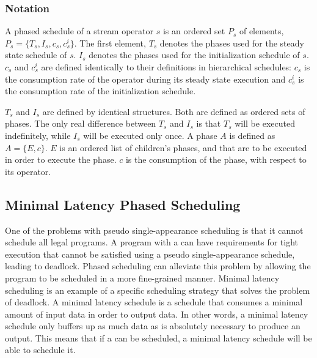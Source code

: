 \subsubsection{Notation}

A phased schedule of a stream operator $s$ is an ordered set
$P_s$ of elements, $P_s = \{T_s, I_s, c_s, c^i_s\}$.  The first
element, $T_s$ denotes the phases used for the steady state
schedule of $s$. $I_s$ denotes the phases used for the
initialization schedule of $s$. $c_s$ and $c^i_s$ are defined
identically to their definitions in hierarchical schedules: $c_s$
is the consumption rate of the operator during its steady state
execution and $c^i_s$ is the consumption rate of the
initialization schedule.

$T_s$ and $I_s$ are defined by identical structures.  Both are
defined as ordered sets of phases. The only real difference
between $T_s$ and $I_s$ is that $T_s$ will be executed
indefinitely, while $I_s$ will be executed only once. A phase $A$
is defined as $A = \{E, c\}$.  $E$ is an ordered list of
children's phases, {\splitters} and {\joiners} that are to be
executed in order to execute the phase. $c$ is the consumption of
the phase, with respect to its operator.

\subsection{Minimal Latency Phased Scheduling}
\label{sec:min-latency}

One of the problems with pseudo single-appearance scheduling is
that it cannot schedule all legal {\StreamIt} programs.  A program
with a {\feedbackloop} can have requirements for tight execution
that cannot be satisfied using a pseudo single-appearance
schedule, leading to deadlock. Phased scheduling can alleviate
this problem by allowing the program to be scheduled in a more
fine-grained manner. Minimal latency scheduling is an example of a
specific scheduling strategy that solves the problem of deadlock.
A minimal latency schedule is a schedule that consumes a minimal
amount of input data in order to output data. In other words, a
minimal latency schedule only buffers up as much data as is
absolutely necessary to produce an output. This means that if a
{\feedbackloop} can be scheduled, a minimal latency schedule will
be able to schedule it.

\subsubsection{\filter}

